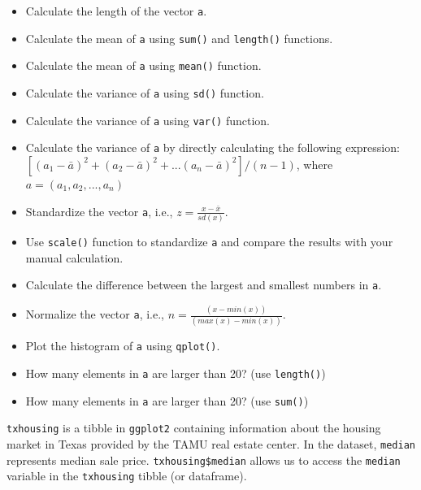 \documentclass[]{book}
\newenvironment{Shaded}{\begin{snugshade}}{\end{snugshade}}
\newcommand{\StringTok}[1]{\textcolor[rgb]{0.31,0.60,0.02}{{#1}}}
\newcommand{\NormalTok}[1]{{#1}}
\begin{document}
\begin{Shaded}
\end{Shaded}

\begin{itemize}
\item
  Calculate the length of the vector \texttt{a}.
\item
  Calculate the mean of \texttt{a} using \texttt{sum()} and
  \texttt{length()} functions.
\item
  Calculate the mean of \texttt{a} using \texttt{mean()} function.
\item
  Calculate the variance of \texttt{a} using \texttt{sd()} function.
\item
  Calculate the variance of \texttt{a} using \texttt{var()} function.
\item
  Calculate the variance of \texttt{a} by directly calculating the
  following expression:
  \([(a_1 - \bar{a})^2 + (a_2 - \bar{a})^2 + ... (a_n - \bar{a})^2]/(n-1)\),
  where \(a = (a_1, a_2, ... , a_n)\)
\item
  Standardize the vector \texttt{a}, i.e.,
  \(z = \frac{x-\bar{x}}{sd(x)}\).
\item
  Use \texttt{scale()} function to standardize \texttt{a} and compare
  the results with your manual calculation.
\item
  Calculate the difference between the largest and smallest numbers in
  \texttt{a}.
\item
  Normalize the vector \texttt{a}, i.e.,
  \(n = \frac{(x-min(x))}{(max(x)-min(x))}\).
\item
  Plot the histogram of \texttt{a} using \texttt{qplot()}.
\item
  How many elements in \texttt{a} are larger than 20? (use
  \texttt{length()})
\item
  How many elements in \texttt{a} are larger than 20? (use
  \texttt{sum()})
\end{itemize}

\texttt{txhousing} is a tibble in \texttt{ggplot2} containing
information about the housing market in Texas provided by the TAMU real
estate center. In the dataset, \texttt{median} represents median sale
price. \texttt{txhousing\$median} allows us to access the
\texttt{median} variable in the \texttt{txhousing} tibble (or
dataframe).

\begin{Shaded}
\end{Shaded}
\end{document}

